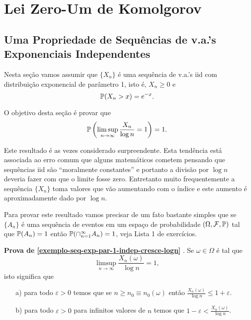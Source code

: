 \chapter[Aula 8]{Lei Zero-Um de Komolgorov}
\chaptermark{}

\section{Uma Propriedade de Sequências de v.a.'s Exponenciais Independentes}


Nesta seção vamos assumir que $\{X_n\}$ é uma sequência 
de v.a.'s iid com distribuição exponencial de parâmetro 1,
isto é, $X_n\geq 0$ e  
\[
	\P(X_n>x)=e^{-x}.
\] 

O objetivo desta seção é provar que 
%
	\begin{equation}\label{exemplo-seq-exp-par-1-indep-cresce-logn}
		\P
		\left(
			\limsup_{n\to\infty}
			\frac{X_n}{\log n} 
			=1
		\right)	
		=1.
	\end{equation}

Este resultado é as vezes considerado surpreendente.
Esta tendência está associada ao erro comum que alguns
matemáticos cometem pensando que sequências iid 
são ``moralmente constantes'' e portanto a divisão 
por $\log n$ deveria fazer com que o limite fosse
zero. 
Entretanto muito frequentemente a sequência $\{X_n\}$
toma valores que vão aumentando com o índice e 
este aumento é aproximadamente dado por $\log n$.

Para provar este resultado vamos precisar de um fato 
bastante simples que se $\{A_n\}$ é uma sequência 
de eventos em um espaço de probabilidade $(\Omega,\F,\P)$
tal que $\P(A_n)=1$ então $\P(\cap_{n=1}^{\infty} A_n)=1$,
veja Lista 1 de exercícios.


\medskip

\noindent
{\bf Prova de \eqref{exemplo-seq-exp-par-1-indep-cresce-logn} }.
Se $\omega\in \Omega$ é tal que 
	\[
		\limsup_{n\to\infty}
		\frac{X_n(\omega)}{\log n} 
		=1,
	\]
isto significa que 
\begin{itemize}
	\item[a)]
	para todo $\varepsilon>0$ temos que se $n\geq n_0\equiv n_0(\omega)$ então
	$\displaystyle\frac{X_n(\omega)}{\log n}\leq 1+\varepsilon$.
	
	
	\item[b)]
	para todo $\varepsilon>0$ para infinitos valores de $n$ 
	temos que 	
	$1-\varepsilon<\displaystyle\frac{X_n(\omega)}{\log n}$.
		
\end{itemize}





